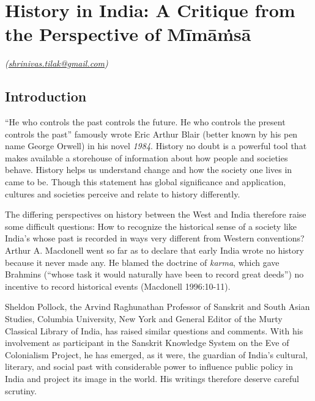 \chapter{History in India: A Critique from the Perspective of Mīmāṁsā}\label{chapter1}


\vskip -7pt

\hfill{\sl(\url{shrinivas.tilak@gmail.com})}

\section*{Introduction}

“He who controls the past controls the future. He who controls the present controls the past” famously wrote Eric Arthur Blair (better known by his pen name George Orwell) in his novel \textit{1984}. History no doubt is a powerful tool that makes available a storehouse of information about how people and societies behave. History helps us understand change and how the society one lives in came to be. Though this statement has global significance and application, cultures and societies perceive and relate to history differently.

The differing perspectives on history between the West and India therefore raise some difficult questions: How to recognize the historical sense of a society like India’s whose past is recorded in ways very different from Western conventions? Arthur A. Macdonell went so far as to declare that early India wrote no history because it never made any. He blamed the doctrine of \textit{karma}, which gave Brahmins (“whose task it would naturally have been to record great deeds”) no incentive to record historical events (Macdonell 1996:10-11).

Sheldon Pollock, the Arvind Raghunathan Professor of Sanskrit and South Asian Studies, Columbia University, New York and General Editor of the Murty Classical Library of India, has raised similar questions and comments. With his involvement as participant in the Sanskrit Knowledge System on the Eve of Colonialism Project, he has emerged, as it were, the guardian of India’s cultural, literary, and social past with considerable power to influence public policy in India and project its image in the world. His writings therefore deserve careful scrutiny.

